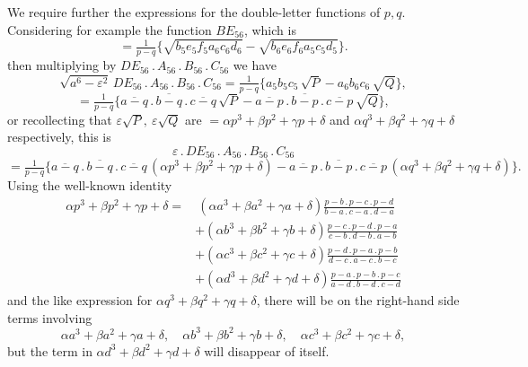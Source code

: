 \documentclass[11pt]{article}
\begin{document}
We require further the expressions for the double-letter functions of $p,q$. Considering for example the function $BE_{56}$, which is
\[
= \tfrac{1}{p-q}\bigl\{\sqrt{b_5 e_5 f_5 a_6 c_6 d_6} - \sqrt{b_6 e_6 f_6 a_5 c_5 d_5}\bigr\}.
\]
then multiplying by $DE_{56}\mathbin{.}A_{56}\mathbin{.}B_{56}\mathbin{.}C_{56}$ we have
\[
\sqrt{a^6 - \varepsilon^2}\, DE_{56}\mathbin{.}A_{56}\mathbin{.}B_{56}\mathbin{.}C_{56} = \tfrac{1}{p-q}\bigl\{a_5 b_5 c_5\,\sqrt{P} - a_6 b_6 c_6\,\sqrt{Q}\bigr\},
\]
\[
= \tfrac{1}{p-q}\bigl\{\overline{a-q}\mathbin{.}\overline{b-q}\mathbin{.}\overline{c-q}\,\sqrt{P} - \overline{a-p}\mathbin{.}\overline{b-p}\mathbin{.}\overline{c-p}\,\sqrt{Q}\bigr\},
\]
or recollecting that $\varepsilon\sqrt{P},\ \varepsilon\sqrt{Q}$ are $= \alpha p^3 + \beta p^2 + \gamma p + \delta$ and $\alpha q^3 + \beta q^2 + \gamma q + \delta$ respectively, this is
\[
\varepsilon\mathbin{.}DE_{56}\mathbin{.}A_{56}\mathbin{.}B_{56}\mathbin{.}C_{56}
\]
\[
= \tfrac{1}{p-q}\bigl\{\overline{a-q}\mathbin{.}\overline{b-q}\mathbin{.}\overline{c-q}\,(\alpha p^3 + \beta p^2 + \gamma p + \delta) - \overline{a-p}\mathbin{.}\overline{b-p}\mathbin{.}\overline{c-p}\,(\alpha q^3 + \beta q^2 + \gamma q + \delta)\bigr\}.
\]
Using the well-known identity
\begin{align*}
\alpha p^3 + \beta p^2 + \gamma p + \delta = &\ (\alpha a^3 + \beta a^2 + \gamma a + \delta)\frac{p-b\mathbin{.}p-c\mathbin{.}p-d}{b-a\mathbin{.}c-a\mathbin{.}d-a}\\
&+ (\alpha b^3 + \beta b^2 + \gamma b + \delta)\frac{p-c\mathbin{.}p-d\mathbin{.}p-a}{c-b\mathbin{.}d-b\mathbin{.}a-b}\\
&+ (\alpha c^3 + \beta c^2 + \gamma c + \delta)\frac{p-d\mathbin{.}p-a\mathbin{.}p-b}{d-c\mathbin{.}a-c\mathbin{.}b-c}\\
&+ (\alpha d^3 + \beta d^2 + \gamma d + \delta)\frac{p-a\mathbin{.}p-b\mathbin{.}p-c}{a-d\mathbin{.}b-d\mathbin{.}c-d}
\end{align*}
and the like expression for $\alpha q^3 + \beta q^2 + \gamma q + \delta$, there will be on the right-hand side terms involving
\[
\alpha a^3 + \beta a^2 + \gamma a + \delta,\quad \alpha b^3 + \beta b^2 + \gamma b + \delta,\quad \alpha c^3 + \beta c^2 + \gamma c + \delta,
\]
but the term in $\alpha d^3 + \beta d^2 + \gamma d + \delta$ will disappear of itself.
\end{document}

